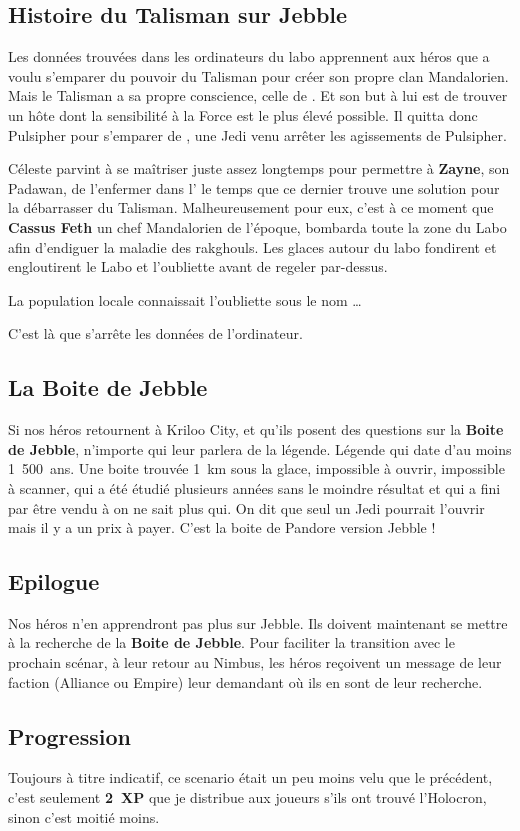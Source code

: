 \subsection{Histoire du Talisman sur Jebble}\label{sec:talisman-jebble}
Les données trouvées dans les ordinateurs du labo apprennent aux héros que  a voulu s’emparer du pouvoir du Talisman pour créer son propre clan Mandalorien. Mais le Talisman a sa propre conscience, celle de . Et son but à lui est de trouver un hôte dont la sensibilité à la Force est le plus élevé possible. Il quitta donc Pulsipher pour s’emparer de , une Jedi venu arrêter les agissements de Pulsipher.

Céleste parvint à se maîtriser juste assez longtemps pour permettre à \textbf{Zayne}, son Padawan, de l’enfermer dans l’ le temps que ce dernier trouve une solution pour la débarrasser du Talisman. Malheureusement pour eux, c’est à ce moment que \textbf{Cassus Feth} un chef Mandalorien de l’époque, bombarda toute la zone du Labo afin d’endiguer la maladie des rakghouls. Les glaces autour du labo fondirent et engloutirent le Labo et l’oubliette avant de regeler par-dessus.

La population locale connaissait l’oubliette sous le nom \ldots 

C’est là que s’arrête les données de l’ordinateur.

\subsection{La Boite de Jebble}\label{sec:boite-de-jebble}
Si nos héros retournent à Kriloo City, et qu’ils posent des questions sur la \textbf{Boite de Jebble}, n’importe qui leur parlera de la légende. Légende qui date d’au moins 1~500~ans. Une boite trouvée 1~km sous la glace, impossible à ouvrir, impossible à scanner, qui a été étudié plusieurs années sans le moindre résultat et qui a fini par être vendu à on ne sait plus qui. On dit que seul un Jedi pourrait l’ouvrir mais il y a un prix à payer. C’est la boite de Pandore version Jebble !

\subsection{\’Epilogue}
Nos héros n’en apprendront pas plus sur Jebble. Ils doivent maintenant se mettre à la recherche de la \textbf{Boite de Jebble}. Pour faciliter la transition avec le prochain scénar, à leur retour au Nimbus, les héros reçoivent un message de leur faction (Alliance ou Empire) leur demandant où ils en sont de leur recherche.

\subsection{Progression}
Toujours à titre indicatif, ce scenario était un peu moins velu que le précédent, c’est seulement \textbf{2~XP} que je distribue aux joueurs s’ils ont trouvé l’Holocron, sinon c’est moitié moins.

